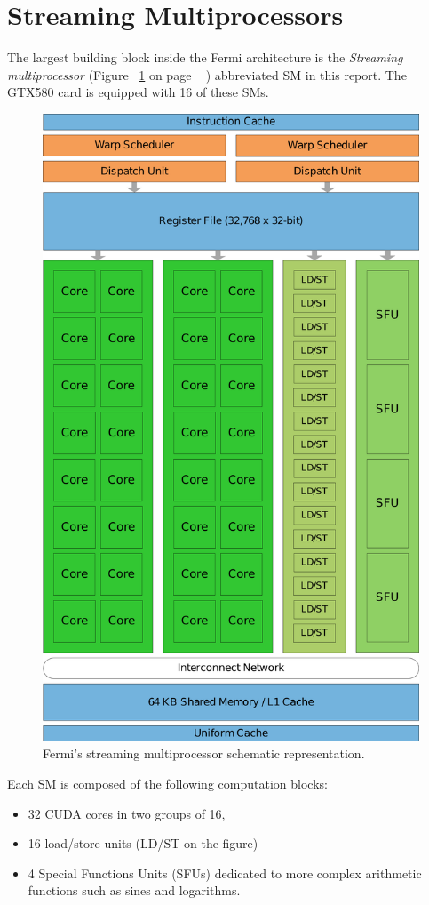 \documentclass{report}
\begin{document}
    \section{Streaming Multiprocessors}
    The largest building block inside the Fermi architecture is the 
    \emph{Streaming multiprocessor} (Figure ~\ref{fig:SM} on page 
    ~\pageref{fig:SM} \cite{fermiWPHERE}) abbreviated SM in this report. The GTX580 card is equipped
    with 16 of these SMs.
    \begin{figure}[H]
    \centering
        \includegraphics[width=0.75\linewidth]{pictures/Fermi}
        \captionsetup{justification=centering}
        \caption{Fermi's streaming multiprocessor schematic representation.}
        \label{fig:SM}
    \end{figure}

    Each SM is composed of the following computation blocks:
    \begin{itemize}
        \item 32 CUDA cores in two groups of 16,
        \item 16 load/store units (LD/ST on the figure)
        \item 4 Special Functions Units (SFUs) dedicated to more complex
              arithmetic functions such as sines and logarithms.
    \end{itemize}
    
\end{document}
